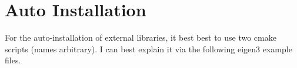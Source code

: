 \section{Auto Installation} \label{s:auto_installation}
For the auto-installation of external libraries, it best best to use two cmake scripts (names arbitrary). I can best explain it via the following eigen3 example files.









